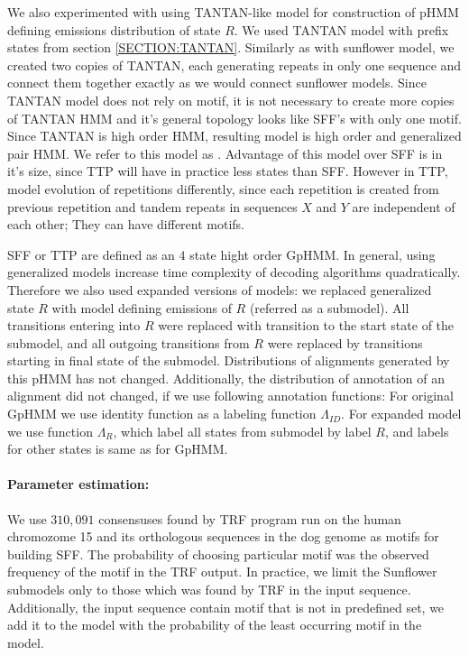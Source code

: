 We also experimented with using TANTAN-like model for construction of pHMM
defining emissions distribution of state $R$. We used TANTAN model with prefix
states from section \ref{SECTION:TANTAN}. Similarly as with sunflower model, we
created two copies of TANTAN, each generating repeats in only one sequence and
connect them together exactly as we would connect sunflower models. Since TANTAN
model does not rely on motif, it is not necessary to create more copies of
TANTAN HMM and it's general topology looks like SFF's with only one motif.
Since TANTAN is high order HMM, resulting model is high order and generalized
pair HMM. We refer to this model as . Advantage
of this model over SFF is in it's size, since TTP will have in practice less
states than SFF. However in TTP, model evolution of repetitions differently,
since each repetition is created from previous repetition and tandem repeats in
sequences $X$ and $Y$ are independent of each other; They can have different
motifs. 

SFF or TTP are defined as an $4$ state hight order GpHMM.  In general, using
generalized models increase time complexity of decoding algorithms
quadratically. Therefore we also used expanded versions of models: we replaced
generalized state $R$ with model defining emissions of $R$ (referred as a
submodel). All transitions entering into $R$ were replaced with transition to
the start state of the submodel, and all outgoing transitions from $R$ were
replaced by transitions starting in final state of the submodel.  Distributions
of alignments generated by this pHMM has not changed. Additionally, the
distribution of annotation of an alignment did not changed, if we use following
annotation functions: For original GpHMM we use identity function as a labeling
function $\Lambda_{ID}$.  For expanded model we use function $\Lambda_R$, which
label all states from submodel by label $R$, and labels for other states is
same as for GpHMM. 

\paragraph{Parameter estimation:}
We use $310,091$ consensuses found by TRF program run on the human chromozome
15 and its orthologous sequences in the dog genome as motifs for building SFF.
The probability of choosing particular motif was the observed frequency of the
motif in the TRF output. In practice, we limit the Sunflower submodels only to
those which was found by TRF in the input sequence.  Additionally, the input
sequence contain motif that is not in predefined set, we add it to the model
with the probability of the least occurring motif in the model.


